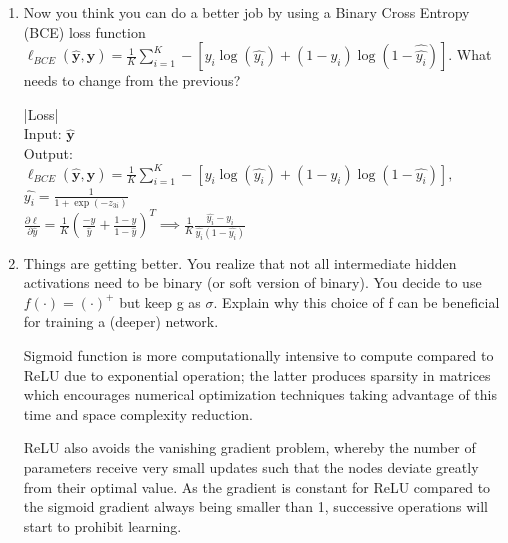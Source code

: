 \documentclass{article}
\begin{document}
\begin{enumerate}
  \item Now you think you can do a better job by using a Binary Cross Entropy
        (BCE) loss function
        $\ell_{BCE}(\bm{\hat{y},y})=\frac{1}{K}\sum_{i=1}^{K}-[y_i\log(\hat{y_i})+(1-y_i)\log(1-\hat{\hat{y_i}})]$.
        What needs to change from the previous?
        \begin{tcolorbox}
          |Loss|\\
          Input: $\bm{\hat{y}}$\\
          Output:
          $\ell_{BCE}(\bm{\hat{y},y})=\frac{1}{K}\sum_{i=1}^{K}-[y_i\log(\hat{y_i})+(1-y_i)\log(1-\hat{y_i})],$\\
          $\hat{y_i}=\frac{1}{1+\exp(-z_{3i})}$\\
          $\frac{\partial \ell}{\partial
              \hat{y}}=\frac{1}{K}(\frac{-y}{\hat{y}}+\frac{1-y}{1-\hat{y}})^T\implies \frac{1}{K}\frac{\hat{y_i}-y_i}{\hat{y_i}(1-\hat{y_i})}$
        \end{tcolorbox}
  \item Things are getting better. You realize that not all intermediate hidden
        activations need to be binary (or soft version of binary). You decide to use
        $f(\cdot)=(\cdot)^{+}$ but keep g as $\sigma$. Explain why this choice of f can
        be beneficial for training a (deeper) network.
        \begin{tcolorbox}
          Sigmoid function is more computationally intensive to compute compared
          to ReLU due to exponential operation; the latter produces sparsity in matrices
          which encourages numerical optimization techniques taking advantage of this
          time and space complexity reduction.
        \end{tcolorbox}
        \begin{tcolorbox}
          ReLU also avoids the vanishing gradient problem, whereby the number of
          parameters receive very small updates such that the nodes deviate greatly from
          their optimal value. As the gradient is constant for ReLU compared to the
          sigmoid gradient always being smaller than 1, successive operations will start
          to prohibit learning.
        \end{tcolorbox}
\end{enumerate}
\end{document}
